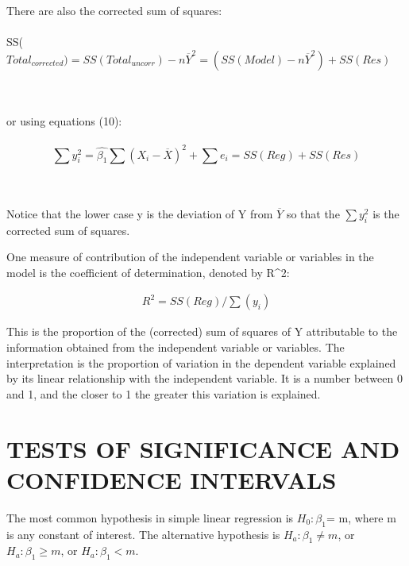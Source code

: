 \documentclass[letterpaper,11pt]{article}
\begin{document}
	There are also the corrected sum of squares:
	\\ \\
	SS($Total_{corrected})= SS(Total_{uncorr}) - n \overline{Y}^2= ( SS(Model)- n \overline{Y}^2) + SS(Res)$ 
	
	\\ \\
	or using equations (10):
	\\ \\
	
		\begin{equation}
		\sum{y_{i}^2}= \hat{\beta_{1}} \sum (X_{i}- \overline{X})^2 + \sum{e_{i}} = SS(Reg) + SS(Res)
		\end{equation}
	
	\\ \\
	Notice that the lower case y is the deviation of Y from $\overline{Y}$ so that the $\sum y_{i}^2$ is the corrected sum of squares.
	
	One measure of contribution of the independent variable or variables in the model is the coefficient of determination, denoted by R^2:

	\begin{equation}	
	\begin{gathered}
	R^2= SS(Reg)/ \sum(y_{i})
	\end{gathered}
	\end{equation}
	
	This is the proportion of the (corrected) sum of squares of Y attributable to the information obtained from the independent variable or 
	variables. The interpretation is the proportion of variation in the dependent variable 
	explained by its linear relationship with the independent variable. It is a number between 0 and 1, and the closer to 1 the greater this 
	variation is explained. 

\section{TESTS OF SIGNIFICANCE AND CONFIDENCE INTERVALS}
	The most common hypothesis in simple linear regression is $H_{0}: \beta_{1}$= m, where m is any constant of interest.
	The alternative hypothesis is $H_{a}: \beta_{1} \neq m$, or $H_{a}: \beta_{1} \geq m$, or $H_{a}: \beta_{1} < m$.
	
\end{document}
